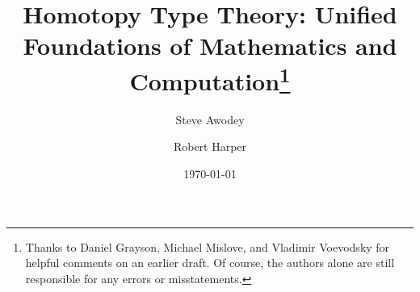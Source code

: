 \documentclass[11pt]{article}
\theoremstyle{remark}
\theoremstyle{definition}
\begin{document}

\title{Homotopy Type Theory: Unified Foundations of Mathematics and Computation\thanks{ Thanks to Daniel Grayson,
    Michael Mislove, and Vladimir Voevodsky for helpful comments on an earlier draft.  Of course, the authors alone are
    still responsible for any errors or misstatements.}  } \author{Steve Awodey \and Robert Harper}
\date{\today}
\maketitle


%   
%  
%  
%   
%   
%   
%     
%
\end{document}
